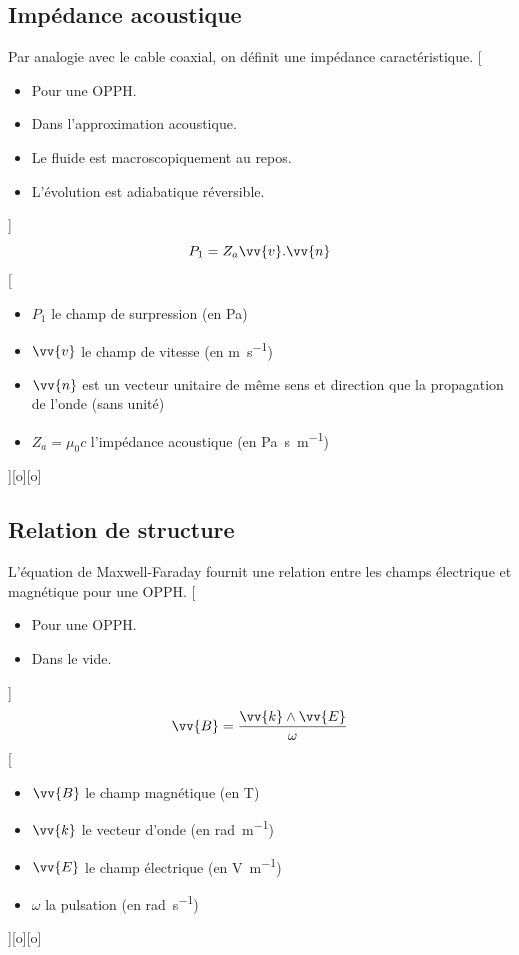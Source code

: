 \subsection{Impédance acoustique}
Par analogie avec le cable coaxial, on définit une impédance caractéristique.
[
    \begin{itemize}
        \item Pour une OPPH.
        \item Dans l'approximation acoustique.
        \item Le fluide est macroscopiquement au repos.
        \item L'évolution est adiabatique réversible.
    \end{itemize}
]
{
    $$P_1=Z_a \vv{v}.\vv{n}$$
}
[
    \begin{itemize}
        \item $P_1$ le champ de surpression (en \unit{Pa})
        \item $\vv{v}$ le champ de vitesse (en \unit{m.s^{-1}})
        \item $\vv{n}$ est un vecteur unitaire de même sens et direction que la propagation de l'onde (sans unité)
        \item $Z_a=\mu_0 c$ l'impédance acoustique (en \unit{Pa.s.m^{-1}})
    \end{itemize}
][o][o]

\subsection{Relation de structure}
L'équation de Maxwell-Faraday fournit une relation entre les champs électrique et magnétique pour une OPPH.
[
    \begin{itemize}
        \item Pour une OPPH.
        \item Dans le vide.
    \end{itemize}
]
{
    $$\vv{B}=\frac{\vv{k}\wedge\vv{E}}{\omega}$$
}
[
    \begin{itemize}
        \item $\vv{B}$ le champ magnétique (en \unit{T})
        \item $\vv{k}$ le vecteur d'onde (en \unit{rad.m^{-1}})
        \item $\vv{E}$ le champ électrique (en \unit{V.m^{-1}})
        \item $\omega$ la pulsation (en \unit{rad.s^{-1}})
    \end{itemize}
][o][o]

